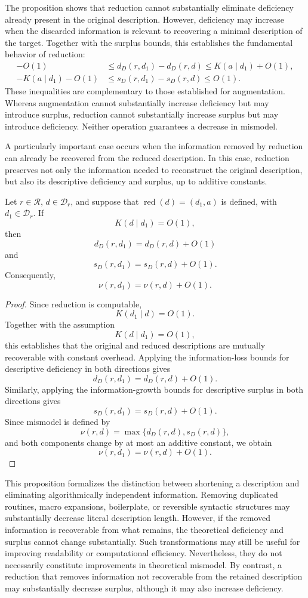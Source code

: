 The proposition shows that reduction cannot substantially eliminate deficiency already present in the original description. However, deficiency may increase when the discarded information is relevant to recovering a minimal description of the target. Together with the surplus bounds, this establishes the fundamental behavior of reduction:
\[
\begin{aligned}
-O(1)
& \leq d_D(r,d_1)-d_D(r,d) \leq K(a\mid d_1)+O(1),\\
-K(a\mid d_1)-O(1)
& \leq s_D(r,d_1)-s_D(r,d) \leq O(1).
\end{aligned}
\]
These inequalities are complementary to those established for augmentation. Whereas augmentation cannot substantially increase deficiency but may introduce surplus, reduction cannot substantially increase surplus but may introduce deficiency. Neither operation guarantees a decrease in mismodel.

A particularly important case occurs when the information removed by reduction can already be recovered from the
reduced description. In this case, reduction preserves not only the information needed to reconstruct the original description, but also its descriptive deficiency and surplus, up to additive constants.

\begin{proposition}
\label{prop:safe_simplification_description}
Let $r\in\mathcal R$, $d\in\mathcal D_r$, and suppose that $\operatorname{red}(d)=(d_1,a)$ is defined, with $d_1\in\mathcal D_r$. If
\[
K(d\mid d_1)=O(1),
\]
then
\[
d_D(r,d_1)=d_D(r,d)+O(1)
\]
and
\[
s_D(r,d_1)=s_D(r,d)+O(1).
\]
Consequently,
\[
\nu(r,d_1)=\nu(r,d)+O(1).
\]
\end{proposition}
\begin{proof}
Since reduction is computable,
\[
K(d_1\mid d)=O(1).
\]
Together with the assumption
\[
K(d\mid d_1)=O(1),
\]
this establishes that the original and reduced descriptions are mutually recoverable with constant overhead. Applying the information-loss bounds for descriptive deficiency in both directions gives
\[
d_D(r,d_1)=d_D(r,d)+O(1).
\]
Similarly, applying the information-growth bounds for descriptive surplus in both directions gives
\[
s_D(r,d_1)=s_D(r,d)+O(1).
\]
Since mismodel is defined by
\[
\nu(r,d)=\max\{d_D(r,d),s_D(r,d)\},
\]
and both components change by at most an additive constant, we obtain
\[
\nu(r,d_1)=\nu(r,d)+O(1).
\]
\end{proof}

This proposition formalizes the distinction between shortening a description and eliminating algorithmically
independent information. Removing duplicated routines, macro expansions, boilerplate, or reversible syntactic structures may substantially decrease literal description length. However, if the removed information is recoverable from what remains, the theoretical deficiency and surplus cannot change substantially. Such transformations may still be useful for improving readability or computational efficiency. Nevertheless, they do not necessarily constitute improvements in theoretical mismodel. By contrast, a reduction that removes information not recoverable from the retained description may substantially decrease surplus, although it may also increase deficiency.

